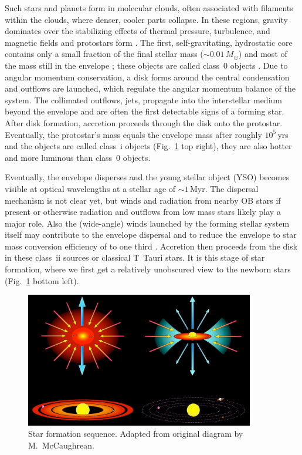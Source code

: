 \documentclass[graybox, nosecnum]{svmult}
\begin{document}
Such stars and planets form in molecular clouds, often associated with filaments within the clouds,  where denser, cooler parts collapse. In these regions, gravity dominates over the stabilizing effects of thermal pressure, turbulence, and magnetic fields \citep[e.g., ][]{McKee_2007} and protostars form  \citep{Andre_2014}. The first, self-gravitating, hydrostatic core contains only a small fraction of the final stellar mass ($\sim0.01\,M_\odot$) and most of the mass still in the envelope \citep[e.g.,][]{Gong_2015,Lee_2020}; these objects are called class~0 objects \citep[see Fig.~\ref{fig:starform_classes} top left, and ][]{Andre_1993, Larson_2003}. Due to angular momentum conservation, a disk forms around the central condensation and outflows are launched, which regulate the angular momentum balance of the system. The collimated outflows, jets, propagate into the interstellar medium beyond the envelope and are often the first detectable signs of a forming star. After disk formation, accretion proceeds through the disk onto the protostar. Eventually, the protostar's mass equals the envelope mass after roughly $10^5$\,yrs and the objects are called class~{\sc i} objects (Fig.~\ref{fig:starform_classes} top right), they are also hotter and more luminous than class~0 objects.

Eventually, the envelope disperses and the young stellar object (YSO) becomes visible at optical wavelengths at a stellar age of $\sim1\,$Myr. The dispersal mechanism is not clear yet, but winds and radiation from nearby OB stars if present or otherwise radiation and outflows from low mass stars likely play a major role. Also the (wide-angle) winds launched by the forming stellar system itself may contribute to the envelope dispersal and to reduce the envelope to star mass conversion efficiency of to one third \citep{Frank_2014}. Accretion then proceeds from the disk in these class~{\sc ii} sources or classical T~Tauri stars. It is this stage of star formation, where we first get a relatively unobscured view to the newborn stars (Fig.~\ref{fig:starform_classes} bottom left).

\begin{figure}[t]
\centering
\includegraphics[width=10cm]{figs/starform_classes.png}
\caption{Star formation sequence. Adapted from original diagram by M.~McCaughrean. \label{fig:starform_classes}}
\end{figure}
\end{document}

